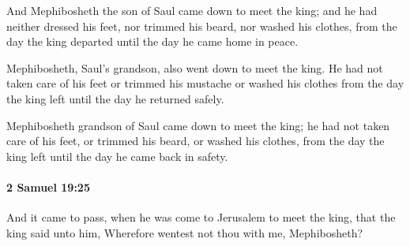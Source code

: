 			\begin{versebox}
					\item[BHS] 
					\item[ASV] And Mephibosheth the son of Saul came down to meet the king; and he had neither dressed his feet, nor trimmed his beard, nor washed his clothes, from the day the king departed until the day he came home in peace.
					\item[NIV] Mephibosheth, Saul’s grandson, also went down to meet the king. He had not taken care of his feet or trimmed his mustache or washed his clothes from the day the king left until the day he returned safely.
					\item[NRSV] Mephibosheth grandson of Saul came down to meet the king; he had not taken care of his feet, or trimmed his beard, or washed his clothes, from the day the king left until the day he came back in safety.
			\end{versebox}

		\paragraph{2 Samuel 19:25} %
			\label{2SAMUEL-19-25}

			And it came to pass, when he was come to Jerusalem to meet the king, that the king said unto him, Wherefore wentest not thou with me, Mephibosheth?

